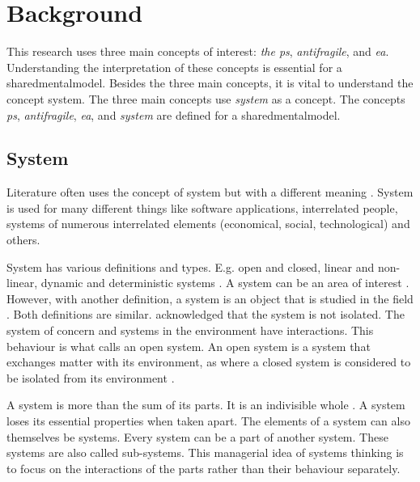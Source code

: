 \chapter{Background}
\label{ch:theoreticalbackground}
This research uses three main concepts of interest: \textit{the \gls{ps}}, \textit{\gls{antifragile}}, and \textit{\gls{ea}}. Understanding the interpretation of these concepts is essential for a \gls{sharedmentalmodel}. Besides the three main concepts, it is vital to understand the concept system. The three main concepts use \textit{system} as a concept. The concepts \textit{\gls{ps}}, \textit{\gls{antifragile}}, \textit{\gls{ea}}, and \textit{system} are defined for a \gls{sharedmentalmodel}.
\section{System}
\label{sec:tbsystem}
Literature often uses the concept of system but with a different meaning \parencite[p.~37]{Lapalme2012}. System is used for many different things like software applications, interrelated people, systems of numerous interrelated elements (economical, social, technological) and others.

System has various definitions and types. E.g. open and closed, linear and non-linear, dynamic and deterministic systems \parencite{Rickles2007}. A system can be an area of interest \parencite[p.~13]{Mannaert2016}. However, with another definition, a system is an object that is studied in the field \parencite[p.~933]{Rickles2007}. Both definitions are similar. \Textcite[pp.~13--14]{Mannaert2016} acknowledged that the system is not isolated. The system of concern and systems in the environment have interactions. This behaviour is what \textcite[p.~32]{Bertalanffy1968} calls an open system. An open system is a system that exchanges matter with its environment, as where a closed system is considered to be isolated from its environment \parencite[p.~39]{Bertalanffy1968}.

A system is more than the sum of its parts. It is an indivisible whole \parencites[p.~51--69]{Ackoff1964}[p.~664]{Ackoff1973}. A system loses its essential properties when taken apart. The elements of a system can also themselves be systems. Every system can be a part of another system. These systems are also called sub-systems. This managerial idea of systems thinking is to focus on the interactions of the parts rather than their behaviour separately. 

